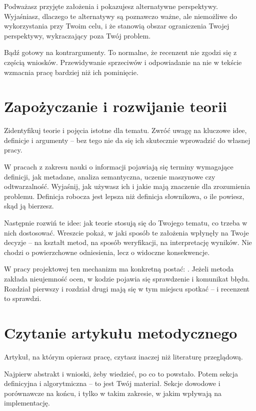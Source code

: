 Podważasz przyjęte założenia i pokazujesz alternatywne perspektywy. Wyjaśniasz, dlaczego te alternatywy są poznawczo ważne, ale niemożliwe do wykorzystania przy Twoim celu, i że stanowią obszar ograniczenia Twojej perspektywy, wykraczający poza Twój problem.

Bądź gotowy na kontrargumenty. To normalne, że recenzent nie zgodzi się z częścią wniosków. Przewidywanie sprzeciwów i odpowiadanie na nie w tekście wzmacnia pracę bardziej niż ich pominięcie.

\section{Zapożyczanie i rozwijanie teorii}

Zidentyfikuj teorie i pojęcia istotne dla tematu. Zwróć uwagę na kluczowe idee, definicje i argumenty -- bez tego nie da się ich skutecznie wprowadzić do własnej pracy.

W pracach z zakresu nauki o informacji pojawiają się terminy wymagające definicji, jak metadane, analiza semantyczna, uczenie maszynowe czy odtwarzalność. Wyjaśnij, jak używasz ich  i jakie mają znaczenie dla zrozumienia problemu. Definicja robocza jest lepsza niż definicja słownikowa, o ile powiesz, skąd ją bierzesz.

Następnie rozwiń te idee: jak teorie stosują się do Twojego tematu, co trzeba w nich dostosować. Wreszcie pokaż, w jaki sposób te założenia wpłynęły na Twoje decyzje -- na kształt metod, na sposób weryfikacji, na interpretację wyników. Nie chodzi o powierzchowne odniesienia, lecz o widoczne konsekwencje.

W pracy projektowej ten mechanizm ma konkretną postać: . Jeżeli metoda zakłada nieujemność ocen, w kodzie pojawia się sprawdzenie i komunikat błędu. Rozdział pierwszy i rozdział drugi mają się w tym miejscu spotkać -- i recenzent to sprawdzi.

\section{Czytanie artykułu metodycznego}

Artykuł, na którym opierasz pracę, czytasz inaczej niż literaturę przeglądową.

 Najpierw abstrakt i wnioski, żeby wiedzieć, po co to powstało. Potem sekcja definicyjna i algorytmiczna -- to jest Twój materiał. Sekcje dowodowe i porównawcze na końcu, i tylko w takim zakresie, w jakim wpływają na implementację.

